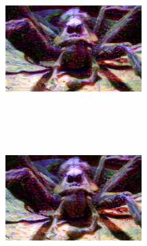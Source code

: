 \begin{multicols}{2}
    \begin{center}
        \captionsetup{type=figure}
        \includegraphics[width=200px, height=200px]{images/comb-aragog-2.png}
    \end{center}
    \begin{center}
        \captionsetup{type=figure}
        \includegraphics[width=200px, height=200px]{images/comb-aragog-3.png}
    \end{center}
\end{multicols}
\clearpage